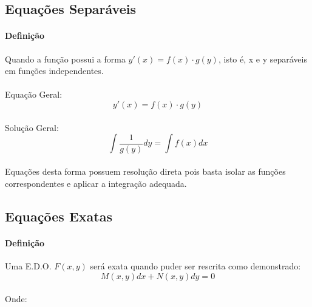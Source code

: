 \documentclass{article}
\begin{document}
            \subsection{Equações Separáveis}
                \paragraph{Definição}Quando a função possui a forma $y'(x)=f(x) \cdot g(y)$, isto é,  x e y separáveis em funções independentes.
                \paragraph{}Equação Geral:
                    \begin{equation}
                        y'(x)=f(x) \cdot g(y)
                    \end{equation}
                
                \paragraph{}Solução Geral:
                    \begin{equation}
                        \int{\frac{1}{g(y)}dy} = \int{f(x)dx}
                    \end{equation}
                \paragraph{}Equações desta forma possuem resolução direta pois basta isolar as funções correspondentes e aplicar a integração adequada.

            \subsection{Equações Exatas}
                \paragraph{Definição}Uma E.D.O. $F(x,y)$ será exata quando puder ser rescrita como demonstrado:
                    \begin{equation}
                        M(x,y)dx+N(x,y)dy=0
                    \end{equation}
                \paragraph{}Onde:
                
\end{document}
